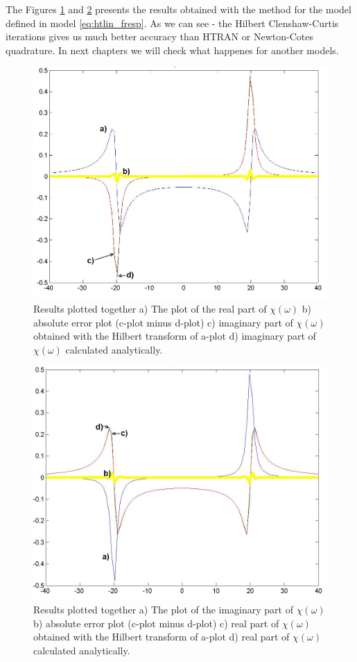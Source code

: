 \documentclass[12pt,twoside,a4paper]{article}
\numberwithin{equation}{subsection}
\numberwithin{figure}{subsection}
\begin{document}
The Figures \ref{fig:cci_lin1} and \ref{fig:cci_lin2} presents the results obtained with the method for the model defined in
model \ref{eq:htlin_fresp}. As we can see - the Hilbert Clenshaw-Curtis iterations gives us much better accuracy than HTRAN or
Newton-Cotes quadrature. In next chapters we will check what happenes for another models.

\begin{figure} 
  \includegraphics[width=150mm]{img/hcc_lin1.png}
  \caption{Results plotted together 
   a) The plot of the real part of $\chi (\omega )$ 
   b) absolute error plot (c-plot minus d-plot) 
   c) imaginary part of $\chi (\omega )$ obtained with the Hilbert transform of a-plot 
   d) imaginary part of $\chi (\omega )$  calculated analytically. \label{fig:cci_lin1}
  }
\end{figure}

\begin{figure} 
  \includegraphics[width=150mm]{img/hcc_lin2.png}
  \caption{Results plotted together 
   a) The plot of the imaginary part of $\chi (\omega )$ 
   b) absolute error plot (c-plot minus d-plot) 
   c) real part of $\chi (\omega )$ obtained with the Hilbert transform of a-plot 
   d) real part of $\chi (\omega )$ calculated analytically. \label{fig:cci_lin2}
  }
\end{figure}
\end{document}
